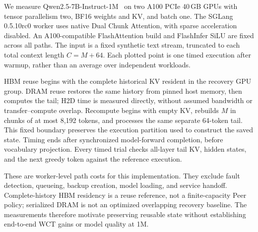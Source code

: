 We measure Qwen2.5-7B-Instruct-1M~\cite{qwen2025qwen25oneM} on two
A100 PCIe 40\,GB GPUs with tensor parallelism two, BF16 weights and KV,
and batch one. The SGLang 0.5.10rc0 worker uses native Dual Chunk Attention,
with sparse acceleration disabled. An A100-compatible FlashAttention build
and FlashInfer SiLU are fixed across all paths. The input is a fixed
synthetic text stream, truncated to each total context length $C=M+64$.
Each plotted point is one timed execution after warmup, rather than an
average over independent workloads.

HBM reuse begins with the complete historical KV resident in the recovery
GPU group. DRAM reuse restores the same history from pinned host memory,
then computes the tail; H2D time is measured directly, without assumed
bandwidth or transfer--compute overlap. Recompute begins with empty KV,
rebuilds $M$ in chunks of at most 8,192 tokens, and processes the same
separate 64-token tail. This fixed boundary preserves the execution
partition used to construct the saved state. Timing ends after synchronized
model-forward completion, before vocabulary projection. Every timed trial
checks all-layer tail KV, hidden states, and the next greedy token against
the reference execution.

These are worker-level path costs for this implementation. They exclude
fault detection, queueing, backup creation, model loading, and service
handoff. Complete-history HBM residency is a reuse reference, not a
finite-capacity Peer policy; serialized DRAM is not an optimized overlapping
recovery baseline. The measurements therefore motivate preserving reusable
state without establishing end-to-end WCT gains or model quality at 1M.
